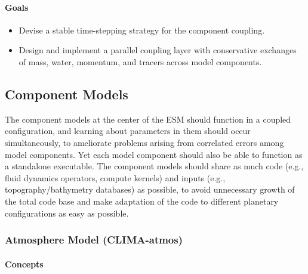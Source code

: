 \documentclass{article}
\begin{document}
\paragraph{Goals}

\begin{itemize}
    \item Devise a stable time-stepping strategy for the component coupling.
    \item Design and implement a parallel coupling layer with conservative exchanges of mass, water, momentum, and tracers across model components.  
\end{itemize}

\subsection{Component Models}

The component models at the center of the ESM should function in a coupled configuration, and learning about parameters in them should occur simultaneously, to ameliorate problems arising from correlated errors among model components. Yet each model component should also be able to function as a standalone executable. The component models should share as much code (e.g., fluid dynamics operators, compute kernels) and inputs (e.g., topography/bathymetry databases) as possible, to avoid unnecessary growth of the total code base and make adaptation of the code to different planetary configurations as easy as possible.

\subsubsection{Atmosphere Model (CLIMA-atmos)}

\paragraph{Concepts}
\end{document}
